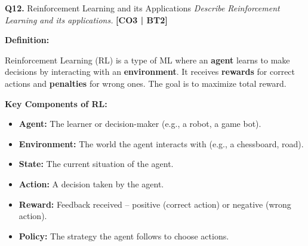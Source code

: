 \documentclass[12pt,a4paper]{article}
\newcommand{\Qno}[1]{\textbf{\color{darkred}Q#1.}}
\newcommand{\term}[1]{\textbf{\color{headingcolor}#1}}
\begin{document}
\vspace{8pt}

\begin{questionbox}{\Qno{12} Reinforcement Learning and its Applications}
\textit{Describe Reinforcement Learning and its applications.} \hfill \textbf{[CO3 | BT2]}
\end{questionbox}

\begin{answerenv}

\textbf{\color{headingcolor}Definition:}

Reinforcement Learning (RL) is a type of ML where an \textbf{agent} learns to make decisions by interacting with an \textbf{environment}. It receives \textbf{rewards} for correct actions and \textbf{penalties} for wrong ones. The goal is to maximize total reward.

\vspace{6pt}
\textbf{\color{headingcolor}Key Components of RL:}

\begin{center}
\end{center}

\begin{itemize}[leftmargin=1.5em, itemsep=3pt]
  \item \term{Agent:} The learner or decision-maker (e.g., a robot, a game bot).
  \item \term{Environment:} The world the agent interacts with (e.g., a chessboard, road).
  \item \term{State:} The current situation of the agent.
  \item \term{Action:} A decision taken by the agent.
  \item \term{Reward:} Feedback received -- positive (correct action) or negative (wrong action).
  \item \term{Policy:} The strategy the agent follows to choose actions.
\end{itemize}


\end{answerenv}
\end{document}

